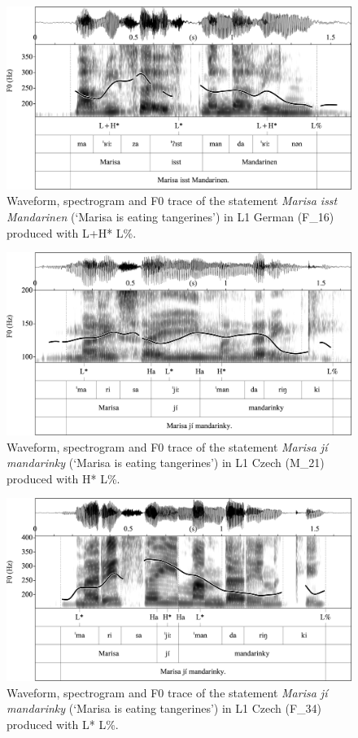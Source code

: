 \begin{figure}
\includegraphics[width=\textwidth]{figures/Figure_4.6.png}
\caption{Waveform, spectrogram and F0 trace of the statement \textit{Marisa isst Mandarinen} (‘Marisa is eating tangerines’) in L1 German \mbox{(F\_16)} produced with L+H* L\%.}
\label{fig:4.6}
\end{figure}

\begin{figure}
\includegraphics[width=\textwidth]{figures/Figure_4.7.png}
\caption{Waveform, spectrogram and F0 trace of the statement \textit{Marisa jí mandarinky} (‘Marisa is eating tangerines’) in L1 Czech \mbox{(M\_21)} produced with H* L\%.}
\label{fig:4.7}
\end{figure}

\begin{figure}
\includegraphics[width=\textwidth]{figures/Figure_4.8.png}
\caption{Waveform, spectrogram and F0 trace of the statement \textit{Marisa jí mandarinky} (‘Marisa is eating tangerines’) in L1 Czech \mbox{(F\_34)} produced with L* L\%.}
\label{fig:4.8}
\end{figure}

